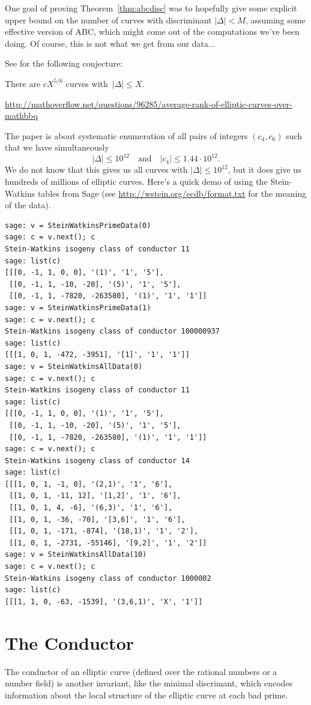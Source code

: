 \documentclass{book}
\begin{document}
One goal of proving Theorem~\ref{thm:abcdisc} was to hopefully
give some explicit upper bound on the number of curves with
discriminant $|\Delta| < M$, assuming some effective version
of ABC, which might come out of the computations we've been
doing.   Of course, this is not what we get from our data...

See \cite[\S3.4]{bmsw:bulletins} for the following conjecture:
\begin{conjecture}
There are $cX^{5/6}$ curves with~$|\Delta|\le X$.
\end{conjecture}
\url{http://mathoverflow.net/questions/96285/average-rank-of-elliptic-curves-over-mathbbq}



The paper \cite{stein-watkins:ants5} is about systematic
enumeration of all pairs of integers $(c_4,c_6)$ such that
we have simultaneously
$$
|\Delta| \leq 10^{12} \quad\text{and}\quad
|c_4|\leq 1.44\cdot 10^{12}.
$$
We do not know that this gives us all curves with $|\Delta|\leq 10^{12}$,
but it does give us hundreds of millions of elliptic curves.
Here's a quick demo of using the Stein-Watkins tables from Sage
(see \url{http://wstein.org/ecdb/format.txt} for the meaning of the data).
\begin{lstlisting}
sage: v = SteinWatkinsPrimeData(0)
sage: c = v.next(); c
Stein-Watkins isogeny class of conductor 11
sage: list(c)
[[[0, -1, 1, 0, 0], '(1)', '1', '5'],
 [[0, -1, 1, -10, -20], '(5)', '1', '5'],
 [[0, -1, 1, -7820, -263580], '(1)', '1', '1']]
sage: v = SteinWatkinsPrimeData(1)
sage: c = v.next(); c
Stein-Watkins isogeny class of conductor 100000937
sage: list(c)
[[[1, 0, 1, -472, -3951], '[1]', '1', '1']]
sage: v = SteinWatkinsAllData(0)
sage: c = v.next(); c
Stein-Watkins isogeny class of conductor 11
sage: list(c)
[[[0, -1, 1, 0, 0], '(1)', '1', '5'],
 [[0, -1, 1, -10, -20], '(5)', '1', '5'],
 [[0, -1, 1, -7820, -263580], '(1)', '1', '1']]
sage: c = v.next(); c
Stein-Watkins isogeny class of conductor 14
sage: list(c)
[[[1, 0, 1, -1, 0], '(2,1)', '1', '6'],
 [[1, 0, 1, -11, 12], '[1,2]', '1', '6'],
 [[1, 0, 1, 4, -6], '(6,3)', '1', '6'],
 [[1, 0, 1, -36, -70], '[3,6]', '1', '6'],
 [[1, 0, 1, -171, -874], '(18,1)', '1', '2'],
 [[1, 0, 1, -2731, -55146], '[9,2]', '1', '2']]
sage: v = SteinWatkinsAllData(10)
sage: c = v.next(); c
Stein-Watkins isogeny class of conductor 1000002
sage: list(c)
[[[1, 1, 0, -63, -1539], '(3,6,1)', 'X', '1']]
\end{lstlisting}


\newpage
\section{The Conductor}
The conductor of an elliptic curve (defined over the rational numbers
or a number field) is another
invariant, like the minimal discrimant,
which encodes information about the local structure
of the elliptic curve at each bad prime.
\end{document}

